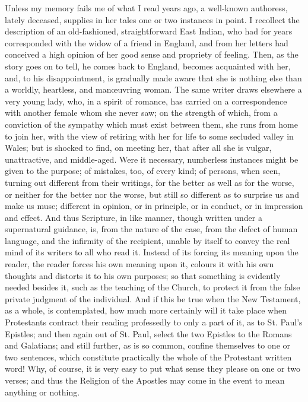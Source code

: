 Unless my memory fails me of what I read years ago, a
well-known authoress, lately deceased, supplies in her
tales one or two instances in point. I recollect the
description of an old-fashioned, straightforward East
Indian, who had for years corresponded with the widow of
a friend in England, and from her letters had conceived a
high opinion of her good sense and propriety of feeling.
Then, as the story goes on to tell, he comes back to
England, becomes acquainted with her, and, to his
disappointment, is gradually made aware that she is
nothing else than a worldly, heartless, and manœuvring
woman. The same writer draws elsewhere a very young lady,
who, in a spirit of romance, has carried on a
correspondence with another female whom she never saw; on
the strength of which, from a conviction of the sympathy
which must exist between them, she runs from home to join
her, with the view of retiring with her for life to some
secluded valley in Wales; but is shocked to find, on
meeting her, that after all she is vulgar, unattractive,
and middle-aged. Were it necessary, numberless instances
might be given to the purpose; of mistakes, too, of every
kind; of persons, when seen, turning out different from
their writings, for the better as well as for the worse,
or neither for the better nor the worse, but still so
different as to surprise us and make us muse; different
in opinion, or in principle, or in conduct, or in
impression and effect. And thus Scripture, in like
manner, though written under a supernatural guidance, is,
from the nature of the case, from the defect of human
language, and the infirmity of the recipient, unable by
itself to convey the real mind of its writers to all who
read it. Instead of its forcing its meaning upon the
reader, the reader forces his own meaning upon it,
colours it with his own thoughts and distorts it to his
own purposes; so that something is evidently needed
besides it, such as the teaching of the Church, to
protect it from the false private judgment of the
individual. And if this be true when the New Testament,
as a whole, is contemplated, how much more certainly will
it take place when Protestants contract their reading
professedly to only a part of it, as to St. Paul's
Epistles; and then again out of St. Paul, select the two
Epistles to the Romans and Galatians; and still further,
as is so common, confine themselves to one or two
sentences, which constitute practically the whole of the
Protestant written word! Why, of course, it is very easy
to put what sense they please on one or two verses; and
thus the Religion of the Apostles may come in the event
to mean anything or nothing.

